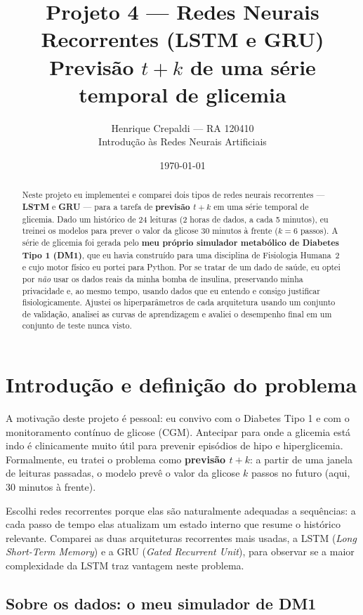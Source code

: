 \documentclass[11pt,a4paper]{article}
\title{\textbf{Projeto 4 --- Redes Neurais Recorrentes (LSTM e GRU)}\\[4pt]
\large Previsão $t+k$ de uma série temporal de glicemia}
\author{Henrique Crepaldi --- RA 120410\\
Introdução às Redes Neurais Artificiais}
\date{\today}
\begin{document}
\maketitle

\begin{abstract}
Neste projeto eu implementei e comparei dois tipos de redes neurais
recorrentes --- \textbf{LSTM} e \textbf{GRU} --- para a tarefa de
\textbf{previsão $t+k$} em uma série temporal de glicemia. Dado um histórico de
24 leituras (2 horas de dados, a cada 5 minutos), eu treinei os modelos para
prever o valor da glicose 30 minutos à frente ($k=6$ passos). A série de
glicemia foi gerada pelo \textbf{meu próprio simulador metabólico de Diabetes
Tipo 1 (DM1)}, que eu havia construído para uma disciplina de Fisiologia
Humana~2 e cujo motor físico eu portei para Python. Por se tratar de um dado de
saúde, eu optei por \emph{não} usar os dados reais da minha bomba de insulina,
preservando minha privacidade e, ao mesmo tempo, usando dados que eu entendo e
consigo justificar fisiologicamente. Ajustei os hiperparâmetros de cada
arquitetura usando um conjunto de validação, analisei as curvas de aprendizagem
e avaliei o desempenho final em um conjunto de teste nunca visto.
\end{abstract}

\section{Introdução e definição do problema}

A motivação deste projeto é pessoal: eu convivo com o Diabetes Tipo 1 e com o
monitoramento contínuo de glicose (CGM). Antecipar para onde a glicemia está
indo é clinicamente muito útil para prevenir episódios de hipo e
hiperglicemia. Formalmente, eu tratei o problema como \textbf{previsão $t+k$}:
a partir de uma janela de leituras passadas, o modelo prevê o valor da glicose
$k$ passos no futuro (aqui, 30 minutos à frente).

Escolhi redes recorrentes porque elas são naturalmente adequadas a sequências:
a cada passo de tempo elas atualizam um estado interno que resume o histórico
relevante. Comparei as duas arquiteturas recorrentes mais usadas, a LSTM
(\emph{Long Short-Term Memory}) e a GRU (\emph{Gated Recurrent Unit}), para
observar se a maior complexidade da LSTM traz vantagem neste problema.

\subsection{Sobre os dados: o meu simulador de DM1}
\end{document}
